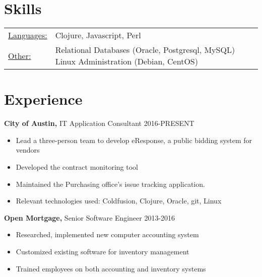 \documentclass[margin]{res}
\begin{document}

\address{
  I am a software engineer with 20 years oi experience, \\
  specialized primarily in web development.
}
\address{
  https://github.com/shadgregory/office \\
  william.shad.gregory@gmail.com
}

\begin{resume}

\section{Skills}
   \begin{tabular}{l p{3in}}
    \underline{Languages:} & Clojure, Javascript, Perl \\

    \underline{Other:} &  Relational Databases (Oracle, Postgresql, MySQL)
    Linux Administration (Debian, CentOS)
   \end{tabular}

\section{Experience}
 {\bf City of Austin,} IT Application Consultant \hfill 2016-PRESENT
 \begin{itemize} \itemsep -2pt  %
 \item Lead a three-person team to develop eResponse, a public bidding system for vendors
 \item Developed the contract monitoring tool
 \item Maintained the Purchasing office’s issue tracking application.
 \item Relevant technologies used: Coldfusion, Clojure, Oracle, git, Linux
 \end{itemize}

{\bf Open Mortgage,} Senior Software Engineer \hfill  2013-2016
\begin{itemize} \itemsep -2pt %
\item Researched, implemented new computer accounting
                 system
\item Customized existing software for inventory
                 management
\item Trained employees on both accounting and inventory
                 systems
\end{itemize}


\end{resume}
\end{document}
